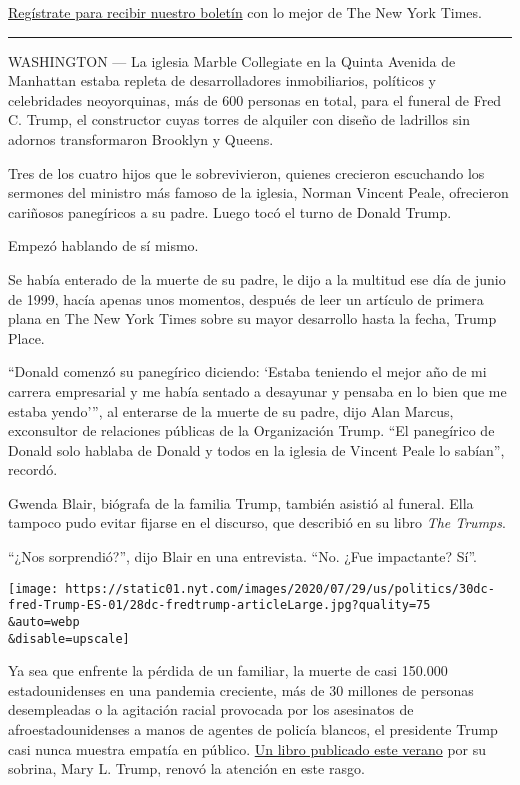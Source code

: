 \href{https://www.nytimes.com/newsletters/el-times}{Regístrate para
recibir nuestro boletín} con lo mejor de The New York Times.

\begin{center}\rule{0.5\linewidth}{\linethickness}\end{center}

WASHINGTON --- La iglesia Marble Collegiate en la Quinta Avenida de
Manhattan estaba repleta de desarrolladores inmobiliarios, políticos y
celebridades neoyorquinas, más de 600 personas en total, para el funeral
de Fred C. Trump, el constructor cuyas torres de alquiler con diseño de
ladrillos sin adornos transformaron Brooklyn y Queens.

Tres de los cuatro hijos que le sobrevivieron, quienes crecieron
escuchando los sermones del ministro más famoso de la iglesia, Norman
Vincent Peale, ofrecieron cariñosos panegíricos a su padre. Luego tocó
el turno de Donald Trump.

Empezó hablando de sí mismo.

Se había enterado de la muerte de su padre, le dijo a la multitud ese
día de junio de 1999, hacía apenas unos momentos, después de leer un
artículo de primera plana en The New York Times sobre su mayor
desarrollo hasta la fecha, Trump Place.

``Donald comenzó su panegírico diciendo: `Estaba teniendo el mejor año
de mi carrera empresarial y me había sentado a desayunar y pensaba en lo
bien que me estaba yendo''', al enterarse de la muerte de su padre, dijo
Alan Marcus, exconsultor de relaciones públicas de la Organización
Trump. ``El panegírico de Donald solo hablaba de Donald y todos en la
iglesia de Vincent Peale lo sabían'', recordó.

Gwenda Blair, biógrafa de la familia Trump, también asistió al funeral.
Ella tampoco pudo evitar fijarse en el discurso, que describió en su
libro \emph{The Trumps}.

``¿Nos sorprendió?'', dijo Blair en una entrevista. ``No. ¿Fue
impactante? Sí''.

\texttt{[image: https://static01.nyt.com/images/2020/07/29/us/politics/30dc-fred-Trump-ES-01/28dc-fredtrump-articleLarge.jpg?quality=75\\\&auto=webp\\\&disable=upscale]}

Ya sea que enfrente la pérdida de un familiar, la muerte de casi 150.000
estadounidenses en una pandemia creciente, más de 30 millones de
personas desempleadas o la agitación racial provocada por los asesinatos
de afroestadounidenses a manos de agentes de policía blancos, el
presidente Trump casi nunca muestra empatía en público.
\href{https://www.nytimes.com/es/2020/07/09/espanol/mundo/libro-mary-trump-sobrina.html}{Un
libro publicado este verano} por su sobrina, Mary L. Trump, renovó la
atención en este rasgo.

